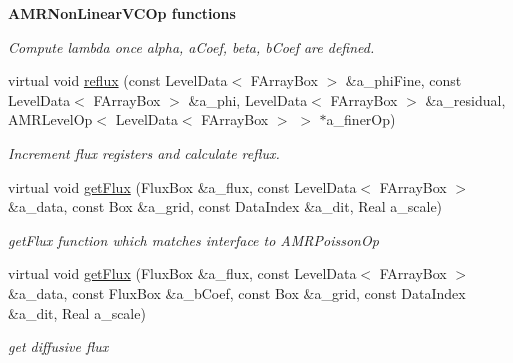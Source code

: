 \begin{Indent}{\bf A\-M\-R\-Non\-Linear\-V\-C\-Op functions}
\begin{DoxyCompactItemize}
\begin{DoxyCompactList}\small\item\em Compute lambda once alpha, a\-Coef, beta, b\-Coef are defined. \end{DoxyCompactList}\item 
\hypertarget{class_a_m_r_non_linear_v_c_op_af7fb4be874164fa69b4bb444fe5b44a6}{virtual void \hyperlink{class_a_m_r_non_linear_v_c_op_af7fb4be874164fa69b4bb444fe5b44a6}{reflux} (const Level\-Data$<$ F\-Array\-Box $>$ \&a\-\_\-phi\-Fine, const Level\-Data$<$ F\-Array\-Box $>$ \&a\-\_\-phi, Level\-Data$<$ F\-Array\-Box $>$ \&a\-\_\-residual, A\-M\-R\-Level\-Op$<$ Level\-Data$<$ F\-Array\-Box $>$ $>$ $\ast$a\-\_\-finer\-Op)}\label{class_a_m_r_non_linear_v_c_op_af7fb4be874164fa69b4bb444fe5b44a6}

\begin{DoxyCompactList}\small\item\em Increment flux registers and calculate reflux. \end{DoxyCompactList}\item 
virtual void \hyperlink{class_a_m_r_non_linear_v_c_op_acabeefd40cc36448de809287222d5611}{get\-Flux} (Flux\-Box \&a\-\_\-flux, const Level\-Data$<$ F\-Array\-Box $>$ \&a\-\_\-data, const Box \&a\-\_\-grid, const Data\-Index \&a\-\_\-dit, Real a\-\_\-scale)
\begin{DoxyCompactList}\small\item\em get\-Flux function which matches interface to A\-M\-R\-Poisson\-Op \end{DoxyCompactList}\item 
\hypertarget{class_a_m_r_non_linear_v_c_op_a2399bd4d0e95ed775a47c38340548b99}{virtual void \hyperlink{class_a_m_r_non_linear_v_c_op_a2399bd4d0e95ed775a47c38340548b99}{get\-Flux} (Flux\-Box \&a\-\_\-flux, const Level\-Data$<$ F\-Array\-Box $>$ \&a\-\_\-data, const Flux\-Box \&a\-\_\-b\-Coef, const Box \&a\-\_\-grid, const Data\-Index \&a\-\_\-dit, Real a\-\_\-scale)}\label{class_a_m_r_non_linear_v_c_op_a2399bd4d0e95ed775a47c38340548b99}

\begin{DoxyCompactList}\small\item\em get diffusive flux \end{DoxyCompactList}\end{DoxyCompactItemize}
\end{Indent}

